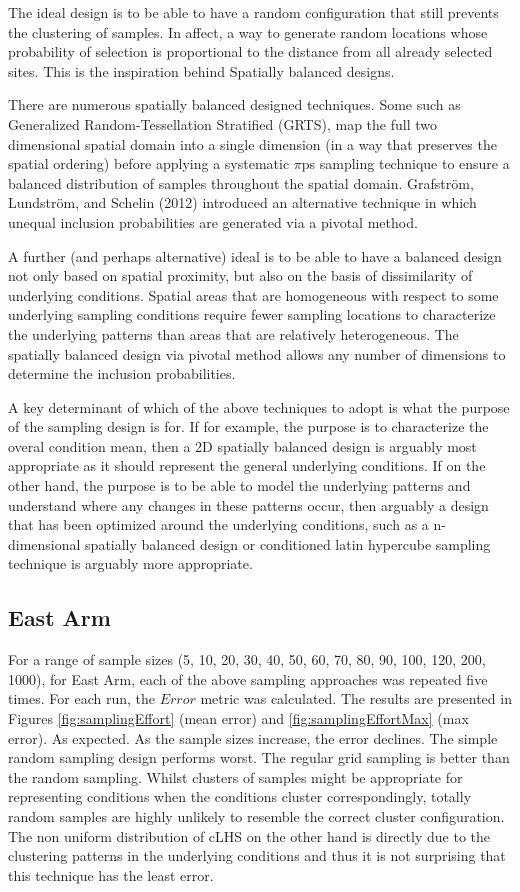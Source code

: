 \documentclass[a4paper]{article}
\begin{document}
The ideal design is to be able to have a random configuration that still
prevents the clustering of samples. In affect, a way to generate random
locations whose probability of selection is proportional to the distance
from all already selected sites. This is the inspiration behind
Spatially balanced designs.

There are numerous spatially balanced designed techniques. Some such as
Generalized Random-Tessellation Stratified (GRTS), map the full two
dimensional spatial domain into a single dimension (in a way that
preserves the spatial ordering) before applying a systematic \(\pi\)ps
sampling technique to ensure a balanced distribution of samples
throughout the spatial domain. Grafström, Lundström, and Schelin (2012)
introduced an alternative technique in which unequal inclusion
probabilities are generated via a pivotal method.

A further (and perhaps alternative) ideal is to be able to have a
balanced design not only based on spatial proximity, but also on the
basis of dissimilarity of underlying conditions. Spatial areas that are
homogeneous with respect to some underlying sampling conditions require
fewer sampling locations to characterize the underlying patterns than
areas that are relatively heterogeneous. The spatially balanced design
via pivotal method allows any number of dimensions to determine the
inclusion probabilities.

A key determinant of which of the above techniques to adopt is what the
purpose of the sampling design is for. If for example, the purpose is to
characterize the overal condition mean, then a 2D spatially balanced
design is arguably most appropriate as it should represent the general
underlying conditions. If on the other hand, the purpose is to be able
to model the underlying patterns and understand where any changes in
these patterns occur, then arguably a design that has been optimized
around the underlying conditions, such as a n-dimensional spatially
balanced design or conditioned latin hypercube sampling technique is
arguably more appropriate.

\hypertarget{east-arm}{%
\subsection{East Arm}\label{east-arm}}

For a range of sample sizes (5, 10, 20, 30, 40, 50, 60, 70, 80, 90, 100,
120, 200, 1000), for East Arm, each of the above sampling approaches was
repeated five times. For each run, the \(Error\) metric was calculated.
The results are presented in Figures \ref{fig:samplingEffort} (mean
error) and \ref{fig:samplingEffortMax} (max error). As expected. As the
sample sizes increase, the error declines. The simple random sampling
design performs worst. The regular grid sampling is better than the
random sampling. Whilst clusters of samples might be appropriate for
representing conditions when the conditions cluster correspondingly,
totally random samples are highly unlikely to resemble the correct
cluster configuration. The non uniform distribution of cLHS on the other
hand is directly due to the clustering patterns in the underlying
conditions and thus it is not surprising that this technique has the
least error.
\end{document}
